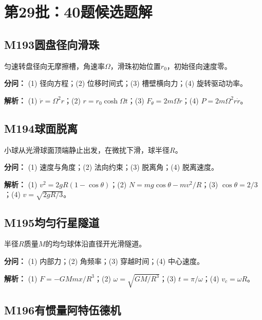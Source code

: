 
\section*{第29批：40题候选题解}

\subsection*{M193\quad 圆盘径向滑珠}

匀速转盘径向无摩擦槽，角速率$\Omega$，滑珠初始位置$r_0$，初始径向速度零。

\par\textbf{分问：} (1) 径向方程；(2) 位移时间式；(3) 槽壁横向力；(4) 旋转驱动功率。

\par\textbf{解析：} (1) $\ddot r=\Omega^2r$；(2) $r=r_0\cosh\Omega t$；(3) $F_\theta=2m\Omega\dot r$；(4) $P=2m\Omega^2r\dot r$。

\medskip

\subsection*{M194\quad 球面脱离}

小球从光滑球面顶端静止出发，在微扰下滑，球半径$R$。

\par\textbf{分问：} (1) 速度与角度；(2) 法向约束；(3) 脱离角；(4) 脱离速度。

\par\textbf{解析：} (1) $v^2=2gR(1-\cos\theta)$；(2) $N=mg\cos\theta-mv^2/R$；(3) $\cos\theta=2/3$；(4) $v=\sqrt{2gR/3}$。

\medskip

\subsection*{M195\quad 均匀行星隧道}

半径$R$质量$M$的均匀球体沿直径开光滑隧道。

\par\textbf{分问：} (1) 内部力；(2) 角频率；(3) 穿越时间；(4) 中心速度。

\par\textbf{解析：} (1) $F=-GMmx/R^3$；(2) $\omega=\sqrt{GM/R^3}$；(3) $t=\pi/\omega$；(4) $v_c=\omega R$。

\medskip

\subsection*{M196\quad 有惯量阿特伍德机}

